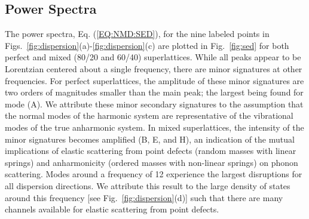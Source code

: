\documentclass[aps,prb,preprint,preprintnumbers,amsmath,amssymb,floatfix,superscriptaddress]{revtex4}
\begin{document}
\subsection{Power Spectra}

The power spectra, Eq. (\ref{EQ:NMD:SED}), for the nine labeled points in Figs.~\ref{fig:dispersion}(a)-\ref{fig:dispersion}(c) are plotted in Fig.~\ref{fig:sed} for both perfect and mixed (80/20 and 60/40) superlattices. While all peaks appear to be Lorentzian centered about a single frequency, there are minor signatures at other frequencies. For perfect superlattices, the amplitude of these minor signatures are two orders of magnitudes smaller than the main peak; the largest being found for mode (A). We attribute these minor secondary signatures to the assumption that the normal modes of the harmonic system are representative of the vibrational modes of the true anharmonic system. In mixed superlattices, the intensity of the minor signatures becomes amplified (B, E, and H), an indication of the mutual implications of elastic scattering from point defects (random masses with linear springs) and anharmonicity (ordered masses with non-linear springs) on phonon scattering. \cite{RevModPhys.53.175}  Modes around a frequency of 12 experience the largest disruptions for all dispersion directions. We attribute this result to the large density of states around this frequency [see Fig.~\ref{fig:dispersion}(d)] such that there are many channels available for elastic scattering from point defects.\cite{tamura_isotope_1983} 
\end{document}
